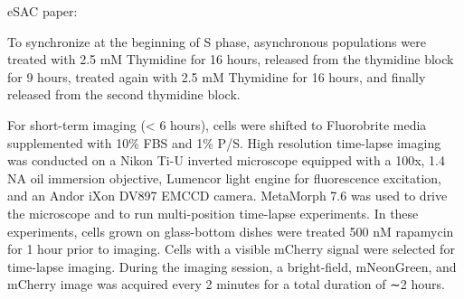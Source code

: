 eSAC paper:

To synchronize at the beginning of S phase, asynchronous populations were treated with 2.5 mM Thymidine for 16 hours, released from the thymidine block for 9 hours, treated again with 2.5 mM Thymidine for 16 hours, and finally released from the second thymidine block.

For short-term imaging (< 6 hours), cells were shifted to Fluorobrite media supplemented with 10\% FBS and 1\% P/S. High resolution time-lapse imaging was conducted on a Nikon Ti-U inverted microscope equipped with a 100x, 1.4 NA oil immersion objective, Lumencor light engine for fluorescence excitation, and an Andor iXon DV897 EMCCD camera. MetaMorph 7.6 was used to drive the microscope and to run multi-position time-lapse experiments. In these experiments, cells grown on glass-bottom dishes were treated 500 nM rapamycin for 1 hour prior to imaging. Cells with a visible mCherry signal were selected for time-lapse imaging. During the imaging session, a bright-field, mNeonGreen, and mCherry image was acquired every 2 minutes for a total duration of ∼2 hours.